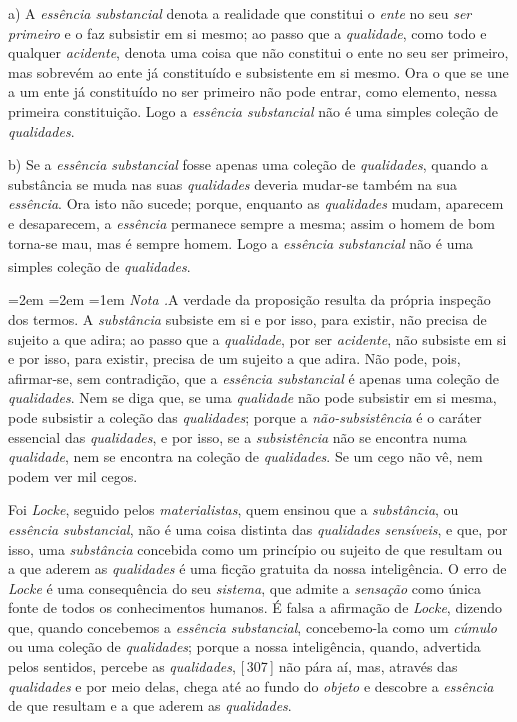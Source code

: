 \documentclass[12pt,a4paper]{article}
\newcommand{\pg}[1]{\thinspace\textup{[\,#1\,]}\thinspace}
\newcommand{\subp}[1]{\medskip\noindent#1)\quad}
\renewcommand\footnote[1]{%
    \stepcounter{footnote}\textsuperscript{\thefootnote}%
    \par
    {\footnotesize
     \leftskip=2em \rightskip=2em \parindent=1em
     \addvspace{\medskipamount}%
     \noindent\textit{Nota \thefootnote.}\enspace #1\par
     \addvspace{\medskipamount}}%
  }
\begin{document}
\subp{a} A \emph{essência substancial} denota a realidade que constitui o
\emph{ente} no seu \emph{ser primeiro} e o faz subsistir em si mesmo; ao passo
que a \emph{qualidade}, como todo e qualquer \emph{acidente}, denota uma coisa
que não constitui o ente no seu ser primeiro, mas sobrevém ao ente já
constituído e subsistente em si mesmo. Ora o que se une a um ente já
constituído no ser primeiro não pode entrar, como elemento, nessa primeira
constituição. Logo a \emph{essência substancial} não é uma simples coleção de
\emph{qualidades}.

\subp{b} Se a \emph{essência substancial} fosse apenas uma coleção de
\emph{qualidades}, quando a substância se muda nas suas \emph{qualidades}
deveria mudar-se também na sua \emph{essência}. Ora isto não sucede; porque,
enquanto as \emph{qualidades} mudam, aparecem e desaparecem, a \emph{essência}
permanece sempre a mesma; assim o homem de bom torna-se mau, mas é sempre
homem. Logo a \emph{essência substancial} não é uma simples coleção de
\emph{qualidades}.\footnote{A verdade da proposição resulta da própria
inspeção dos termos. A \emph{substância} subsiste em si e por isso, para
existir, não precisa de sujeito a que adira; ao passo que a \emph{qualidade},
por ser \emph{acidente}, não subsiste em si e por isso, para existir, precisa
de um sujeito a que adira. Não pode, pois, afirmar-se, sem contradição, que a
\emph{essência substancial} é apenas uma coleção de \emph{qualidades}.
\textemdash{} Nem se diga que, se uma \emph{qualidade} não pode subsistir em si
mesma, pode subsistir a coleção das \emph{qualidades}; porque a
\emph{não-subsistência} é o caráter essencial das \emph{qualidades}, e por
isso, se a \emph{subsistência} não se encontra numa \emph{qualidade}, nem se
encontra na coleção de \emph{qualidades}. Se um cego não vê, nem podem ver mil
cegos.

  Foi \emph{Locke}, seguido pelos \emph{materialistas}, quem ensinou
  \textemdash{} que a \emph{substância}, ou \emph{essência substancial}, não é
  uma coisa distinta das \emph{qualidades sensíveis}, \textemdash{} e que, por
  isso, uma \emph{substância} concebida como um princípio ou sujeito de que
  resultam ou a que aderem as \emph{qualidades} é uma ficção gratuita da nossa
  inteligência. \textemdash{} O erro de \emph{Locke} é uma consequência do seu
  \emph{sistema}, que admite a \emph{sensação} como única fonte de todos os
  conhecimentos humanos. \textemdash{} É falsa a afirmação de \emph{Locke},
  dizendo que, quando concebemos a \emph{essência substancial}, concebemo-la
  como um \emph{cúmulo} ou uma coleção de \emph{qualidades}; porque a nossa
  inteligência, quando, advertida pelos sentidos, percebe as \emph{qualidades},
  \pg{307} não pára aí, mas, através das \emph{qualidades} e por meio delas,
  chega até ao fundo do \emph{objeto} e descobre a \emph{essência} de que
  resultam e a que aderem as \emph{qualidades}.}
\end{document}
